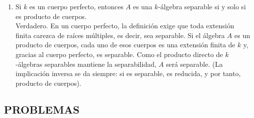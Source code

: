 \begin{enumerate}
    \item Si $k$ es un cuerpo perfecto, entonces $A$ es una $k$-álgebra separable si y solo si es producto de cuerpos.\\
    Verdadero. En un cuerpo perfecto, la definición exige que toda extensión finita carezca de raíces múltiples, es decir, sea separable. Si el álgebra $A$ es un producto de cuerpos, cada uno de esos cuerpos es una extensión finita de $k$ y, gracias al cuerpo perfecto, es separable. Como el producto directo de $k$-álgebras separables mantiene la separabilidad, $A$ será separable. (La implicación inversa se da siempre: si es separable, es reducida, y por tanto, producto de cuerpos).
\end{enumerate}

\vspace{0.5cm}

\subsection*{PROBLEMAS}

